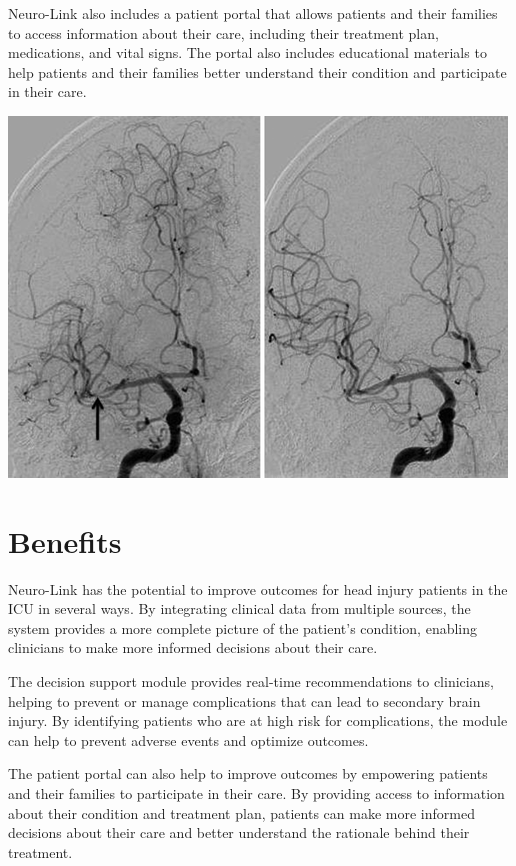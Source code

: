 \documentclass{article}
\begin{document}
Neuro-Link also includes a patient portal that allows patients and their families to access information about their care, including their treatment plan, medications, and vital signs. The portal also includes educational materials to help patients and their families better understand their condition and participate in their care.
\begin{center}
  \includegraphics[width=\textwidth]{image2.png}
\end{center}
\section{Benefits}

Neuro-Link has the potential to improve outcomes for head injury patients in the ICU in several ways. By integrating clinical data from multiple sources, the system provides a more complete picture of the patient's condition, enabling clinicians to make more informed decisions about their care.

The decision support module provides real-time recommendations to clinicians, helping to prevent or manage complications that can lead to secondary brain injury. By identifying patients who are at high risk for complications, the module can help to prevent adverse events and optimize outcomes.

The patient portal can also help to improve outcomes by empowering patients and their families to participate in their care. By providing access to information about their condition and treatment plan, patients can make more informed decisions about their care and better understand the rationale behind their treatment.
\end{document}
